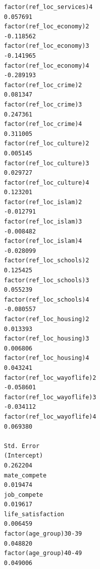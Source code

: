\documentclass[
]{article}
\begin{document}
\begin{table}
\begin{minipage}[t]{\linewidth}
{\begin{verbatim}
factor(ref_loc_services)4                                                          0.057691
factor(ref_loc_economy)2                                                          -0.118562
factor(ref_loc_economy)3                                                          -0.141965
factor(ref_loc_economy)4                                                          -0.289193
factor(ref_loc_crime)2                                                             0.081347
factor(ref_loc_crime)3                                                             0.247361
factor(ref_loc_crime)4                                                             0.311005
factor(ref_loc_culture)2                                                           0.005145
factor(ref_loc_culture)3                                                           0.029727
factor(ref_loc_culture)4                                                           0.123201
factor(ref_loc_islam)2                                                            -0.012791
factor(ref_loc_islam)3                                                            -0.008482
factor(ref_loc_islam)4                                                            -0.028099
factor(ref_loc_schools)2                                                           0.125425
factor(ref_loc_schools)3                                                           0.055239
factor(ref_loc_schools)4                                                          -0.080557
factor(ref_loc_housing)2                                                           0.013393
factor(ref_loc_housing)3                                                           0.006806
factor(ref_loc_housing)4                                                           0.043241
factor(ref_loc_wayoflife)2                                                        -0.058601
factor(ref_loc_wayoflife)3                                                        -0.034112
factor(ref_loc_wayoflife)4                                                         0.069380
                                                                                  Std. Error
(Intercept)                                                                         0.262204
mate_compete                                                                        0.019474
job_compete                                                                         0.019617
life_satisfaction                                                                   0.006459
factor(age_group)30-39                                                              0.048820
factor(age_group)40-49                                                              0.049006

\end{verbatim}}
\end{minipage}
\end{table}
\end{document}
